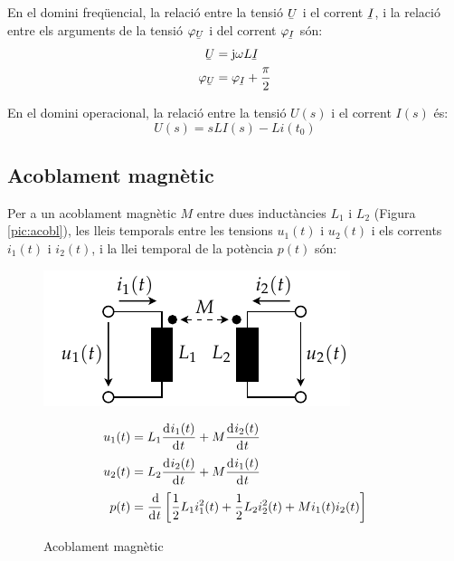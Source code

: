 En el domini freq\"{u}encial, la relaci\'{o} entre la tensi\'{o} $\cmplx{U}$ i el corrent $\cmplx{I}$, i la relaci\'{o} entre els arguments de la tensi\'{o} $\varphi_{\cmplx{U}}$ i del corrent $\varphi_{\cmplx{I}}$ s\'{o}n:
\begin{align}
   \cmplx{U} &= \ju \omega L \cmplx{I} \\
   \varphi_{\cmplx{U}} &= \varphi_{\cmplx{I}} + \frac{\pi}{2}
\end{align}

 En el domini operacional, la relaci\'{o} entre la tensi\'{o} $U(s)$ i el corrent $I(s)$ \'{e}s:
\begin{equation}
   U(s) = s L I(s) - L i(t_0)
\end{equation}


\subsection{Acoblament magn\`{e}tic} 

Per a un acoblament magn\`{e}tic $M$ entre dues
induct\`{a}ncies $L_1$ i $L_2$ (Figura \vref{pic:acobl}), les lleis temporals entre les
tensions $u_1(t)$ i $u_2(t)$ i els corrents $i_1(t)$ i $i_2(t)$,  i la llei temporal
de la pot\`{e}ncia $p(t)$ s\'{o}n: \pagebreak
\begin{figure}[h!]
\hfill
\begin{minipage}[b]{6cm}
   \includegraphics{Imatges/Cap-Fonaments-Acobl-Magnetic.pdf}
   \caption{Acoblament magn\`{e}tic} \label{pic:acobl}
\end{minipage}
\hfill
\begin{minipage}[b][3.8cm][t]{10cm}
   \begin{align}
      u_1(t) &= L_1 \deriv{i_1(t)}{t} + M \deriv{i_2(t)}{t} \\
      u_2(t) &= L_2 \deriv{i_2(t)}{t} + M \deriv{i_1(t)}{t} \\
      p(t) &= \frac{\diff}{\diff t} \left[ \frac{1}{2} L_1 i_1^2(t) + \frac{1}{2} L_2 i_2^2(t) +
      M i_1(t) i_2(t) \right]
   \end{align}
\end{minipage}
\end{figure}

